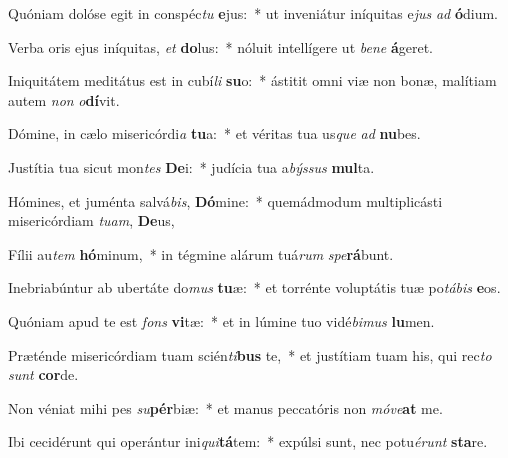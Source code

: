 \item Quóniam dolóse egit in conspéc\textit{tu} \textbf{e}jus:~* ut inveniátur iníquitas e\textit{jus} \textit{ad} \textbf{ó}dium.
\item Verba oris ejus iníquitas, \textit{et} \textbf{do}lus:~* nóluit intellígere ut \textit{be}\textit{ne} \textbf{á}geret.
\item Iniquitátem meditátus est in cubí\textit{li} \textbf{su}o:~* ástitit omni viæ non bonæ, malítiam autem \textit{non} \textit{o}\textbf{dí}vit.
\item Dómine, in cælo misericórdi\textit{a} \textbf{tu}a:~* et véritas tua us\textit{que} \textit{ad} \textbf{nu}bes.
\item Justítia tua sicut mon\textit{tes} \textbf{De}i:~* judícia tua a\textit{býs}\textit{sus} \textbf{mul}ta.
\item Hómines, et juménta salvá\textit{bis}, \textbf{Dó}mine:~* quemádmodum multiplicásti misericórdiam \textit{tu}\textit{am}, \textbf{De}us,
\item Fílii au\textit{tem} \textbf{hó}minum,~* in tégmine alárum tuá\textit{rum} \textit{spe}\textbf{rá}bunt.
\item Inebriabúntur ab ubertáte do\textit{mus} \textbf{tu}æ:~* et torrénte voluptátis tuæ po\textit{tá}\textit{bis} \textbf{e}os.
\item Quóniam apud te est \textit{fons} \textbf{vi}tæ:~* et in lúmine tuo vidé\textit{bi}\textit{mus} \textbf{lu}men.
\item Præténde misericórdiam tuam scién\textit{ti}\textbf{bus} te,~* et justítiam tuam his, qui rec\textit{to} \textit{sunt} \textbf{cor}de.
\item Non véniat mihi pes \textit{su}\textbf{pér}biæ:~* et manus peccatóris non \textit{mó}\textit{ve}\textbf{at} me.
\item Ibi cecidérunt qui operántur ini\textit{qui}\textbf{tá}tem:~* expúlsi sunt, nec potu\textit{é}\textit{runt} \textbf{sta}re.
